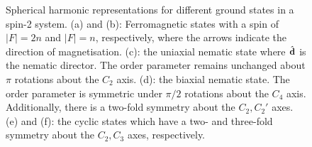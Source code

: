 \begin{figure}
    \caption[Spherical harmonic representation of spin-2 ground states]
    {\label{fig: spin-2-spherical-harmonics}Spherical harmonic
        representations for different ground states in a spin-2 system.
        (a) and (b): Ferromagnetic states with a spin of \(|F|=2n\) and
        \(|F|=n\), respectively, where the arrows indicate the direction of
        magnetisation.
        (c): the uniaxial nematic state where \(\hat{\vb{d}}\) is the nematic
        director. The order parameter remains unchanged about \(\pi \) rotations
        about the \(C_2\) axis.
        (d): the biaxial nematic state. The order parameter is symmetric under
        \(\pi/2\) rotations about the \(C_4\) axis.
        Additionally, there is a two-fold symmetry about the \(C_2, C_2'\) axes.
        (e) and (f): the cyclic states which have a two- and three-fold symmetry
        about the \(C_2, C_3\) axes, respectively.
    }
\end{figure}

